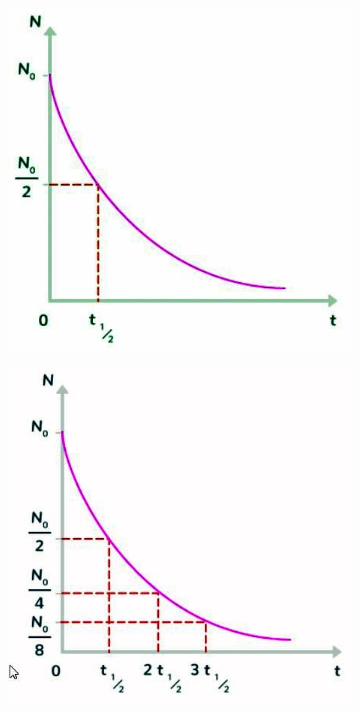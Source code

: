 \documentclass[11pt,a4paper]{article}
\begin{document}
\begin{figure}[H]
\centering
\begin{subfigure}{.32\textwidth}
  \centering
  \includegraphics[width=.95\linewidth]{imgs/p8/demivie.jpg}  
\end{subfigure}
\begin{subfigure}{.32\textwidth}
  \centering
  \includegraphics[width=.95\linewidth]{imgs/p8/decroissances.jpg}  

\end{subfigure}
\end{figure}
\end{document}
